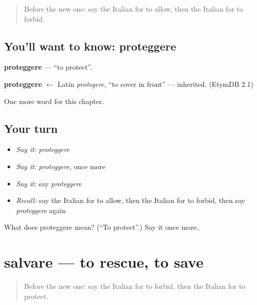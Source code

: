 \label{lesson:IT-C177-proteggere}



\begin{quote}
Before the new one: say the Italian for to allow, then the Italian for to forbid.
\end{quote}

\subsection*{You'll want to know: proteggere}
\textbf{proteggere} — \textquotedblleft{}to protect\textquotedblright{}.

\begin{cousinweb}
\textbf{proteggere} $\leftarrow$ Latin \emph{protegere}, \textquotedblleft{}to cover in front\textquotedblright{} — inherited. (EtymDB 2.1)
\end{cousinweb}

\begin{grammarlens}[title={What you've built}]
One more word for this chapter.
\end{grammarlens}

\subsection*{Your turn}
\begin{itemize}
\raggedright
  \item \emph{Say it:} \emph{proteggere}
  \item \emph{Say it:} \emph{proteggere}, once more
  \item \emph{Say it:} say \emph{proteggere}
  \item \emph{Recall:} say the Italian for to allow, then the Italian for to forbid, then say \emph{proteggere} again
\end{itemize}

\begin{tcolorbox}[breakable,colback=teal!4,colframe=teal!35!black,title={Before you move on}]
What does proteggere mean? (\textquotedblleft{}To protect\textquotedblright{}.) Say it once more.
\end{tcolorbox}
\section[salvare]{salvare — to rescue, to save}

\label{lesson:IT-C177-salvare}



\begin{quote}
Before the new one: say the Italian for to forbid, then the Italian for to protect.
\end{quote}

